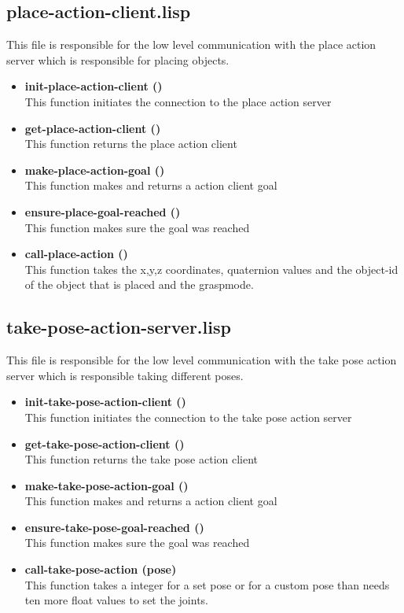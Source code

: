 \documentclass[main.tex]{subfiles}
\begin{document}
		\subsection{place-action-client.lisp}
		This file is responsible for the low level communication with the
		place action server which is responsible for placing objects.
	    \begin{itemize}
			\item \textbf{init-place-action-client ()} \\
			This function initiates the connection to the place action server
			\item \textbf{get-place-action-client ()} \\
			This function returns the place action client
			\item \textbf{make-place-action-goal ()} \\
			This function makes and returns a action client goal
			\item \textbf{ensure-place-goal-reached ()} \\
            This function makes sure the goal was reached
			\item \textbf{call-place-action ()} \\
			This function takes the x,y,z coordinates, quaternion values  and the object-id of the object that is placed and the graspmode.
		\end{itemize}
		\subsection{take-pose-action-server.lisp}
		This file is responsible for the low level communication with the
		take pose action server which is responsible taking different poses.
		\begin{itemize}
			\item \textbf{init-take-pose-action-client ()} \\
			This function initiates the connection to the take pose action server
			\item \textbf{get-take-pose-action-client ()} \\
			This function returns the take pose action client
			\item \textbf{make-take-pose-action-goal ()} \\
			This function makes and returns a action client goal
			\item \textbf{ensure-take-pose-goal-reached ()} \\
            This function makes sure the goal was reached
			\item \textbf{call-take-pose-action (pose)} \\
			This function takes a integer for a set pose or for a custom pose than needs ten more float values to set the joints.
		\end{itemize}
\end{document}
